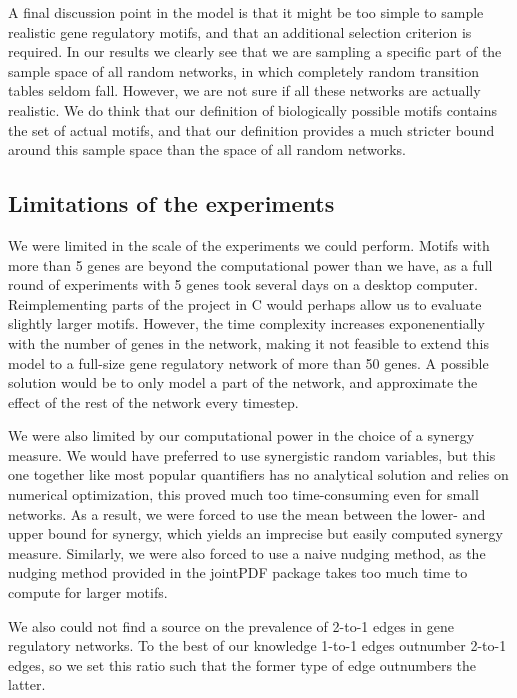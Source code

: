 \documentclass[../main.tex]{subfiles}
\begin{document}
A final discussion point in the model is that it might be too simple to sample realistic gene regulatory motifs, and that an additional selection criterion is required.
In our results we clearly see that we are sampling a specific part of the sample space of all random networks, in which completely random transition tables seldom fall.
However, we are not sure if all these networks are actually realistic.
We do think that our definition of biologically possible motifs contains the set of actual motifs, and that our definition provides a much stricter bound around this sample space than the space of all random networks.

\subsection{Limitations of the experiments}

We were limited in the scale of the experiments we could perform.
Motifs with more than 5 genes are beyond the computational power than we have, as a full round of experiments with 5 genes took several days on a desktop computer. %
Reimplementing parts of the project in C would perhaps allow us to evaluate slightly larger motifs.
However, the time complexity increases exponenentially with the number of genes in the network, making it not feasible to extend this model to a full-size gene regulatory network of more than 50 genes.
A possible solution would be to only model a part of the network, and approximate the effect of the rest of the network every timestep.

We were also limited by our computational power in the choice of a synergy measure.
We would have preferred to use synergistic random variables, but this one together like most popular quantifiers has no analytical solution and relies on numerical optimization, this proved much too time-consuming even for small networks.
As a result, we were forced to use the mean between the lower- and upper bound for synergy, which yields an imprecise but easily computed synergy measure.
Similarly, we were also forced to use a naive nudging method, as the nudging method provided in the jointPDF package takes too much time to compute for larger motifs.

We also could not find a source on the prevalence of 2-to-1 edges in gene regulatory networks.
To the best of our knowledge 1-to-1 edges outnumber 2-to-1 edges, so we set this ratio such that the former type of edge outnumbers the latter.
\end{document}

